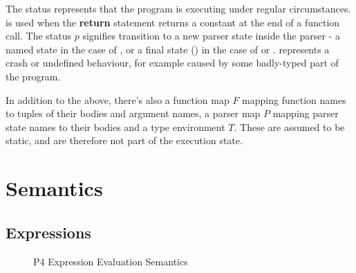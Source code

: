 \documentclass[UTF8]{article}
\begin{document}
The status \running{} represents that the program is executing under regular circumstances.  is used when the \textbf{return} statement returns a constant \cval{} at the end of a function call. The status $p$ signifies transition to a new parser state inside the parser - a named state in the case of \trans{\vn{}}, or a final state (\pfin{}) in the case of \accept{} or \reject{}. \sterr{} represents a crash or undefined behaviour, for example caused by some badly-typed part of the program. 

In addition to the above, there's also a function map $F$ mapping function names to tuples of their bodies and argument names, a parser map $P$ mapping parser state names to their bodies and a type environment $T$. These are assumed to be static, and are therefore not part of the execution state.

\section{Semantics}
\subsection{Expressions}

\begin{figure}[ht!]
\caption{P4 Expression Evaluation Semantics}
\label{fig:semexp}
\end{figure}
\newcommand{\expr}{\ensuremath{e}}
\end{document}
